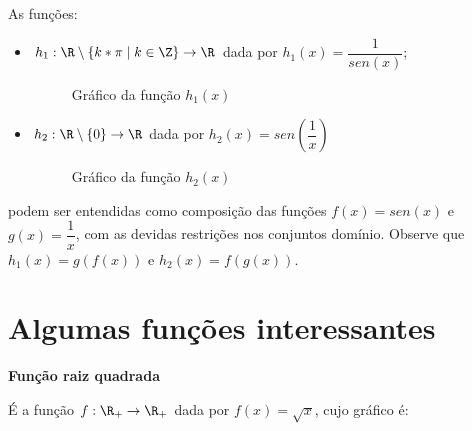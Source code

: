 \begin{exem}
As funções:
\begin{itemize}
\item $h_1: \R \setminus \{k*\pi \mid k \in \Z\} \to \R$ dada por $h_1(x)= \dfrac{1}{sen(x)}$;
  \begin{figure}[H]
 \centering
    \caption{Gráfico da função $h_1(x)$}
  \end{figure}
\item $h_2: \R \setminus \{0\} \to \R$ dada por $h_2(x)= sen \left(\dfrac{1}{x} \right)$
  \begin{figure}[H]
 \centering
    \caption{Gráfico da função $h_2(x)$}
  \end{figure}
\end{itemize}
podem ser entendidas como composição das funções $f(x)= sen(x)$ e $g(x)= \dfrac{1}{x}$, com as devidas restrições nos conjuntos domínio. Observe que $h_1(x)= g(f(x))$ e $h_2(x)= f(g(x))$.
\end{exem}



\section{Algumas funções interessantes}

  \textbf{Função raiz quadrada}

  É a função $f: \R_{+} \to \R_{+}$ dada por $f(x)= \sqrt{x}$, cujo gráfico é:

